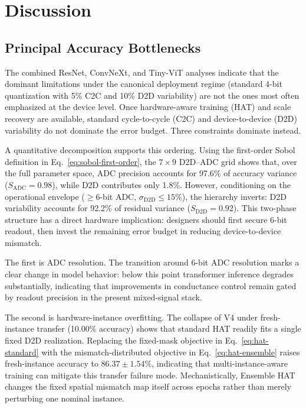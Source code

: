 \section{Discussion}
\label{sec:discussion}

\subsection{Principal Accuracy Bottlenecks}

The combined ResNet, ConvNeXt, and Tiny-ViT analyses indicate that the dominant limitations under the canonical deployment regime (standard 4-bit quantization with 5\% C2C and 10\% D2D variability) are not the ones most often emphasized at the device level. Once hardware-aware training (HAT) and scale recovery are available, standard cycle-to-cycle (C2C) and device-to-device (D2D) variability do not dominate the error budget. Three constraints dominate instead.

A quantitative decomposition supports this ordering. Using the first-order Sobol definition in Eq.~\ref{eq:sobol-first-order}, the $7 \times 9$ D2D--ADC grid shows that, over the full parameter space, ADC precision accounts for 97.6\% of accuracy variance ($S_{\mathrm{ADC}}=0.98$), while D2D contributes only 1.8\%. However, conditioning on the operational envelope ($\geq$6-bit ADC, $\sigma_{\mathrm{D2D}} \leq 15\%$), the hierarchy inverts: D2D variability accounts for 92.2\% of residual variance ($S_{\mathrm{D2D}}=0.92$). This two-phase structure has a direct hardware implication: designers should first secure 6-bit readout, then invest the remaining error budget in reducing device-to-device mismatch.

The first is ADC resolution. The transition around 6-bit ADC resolution marks a clear change in model behavior: below this point transformer inference degrades substantially, indicating that improvements in conductance control remain gated by readout precision in the present mixed-signal stack.

The second is hardware-instance overfitting. The collapse of V4 under fresh-instance transfer (10.00\% accuracy) shows that standard HAT readily fits a single fixed D2D realization. Replacing the fixed-mask objective in Eq.~\ref{eq:hat-standard} with the mismatch-distributed objective in Eq.~\ref{eq:hat-ensemble} raises fresh-instance accuracy to \(86.37\pm1.54\%\), indicating that multi-instance-aware training can mitigate this transfer failure mode. Mechanistically, Ensemble HAT changes the fixed spatial mismatch map itself across epochs rather than merely perturbing one nominal instance.


